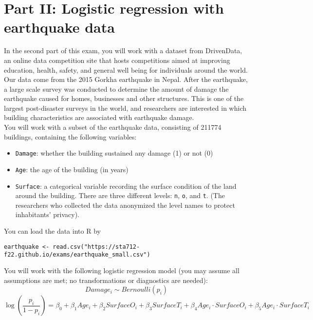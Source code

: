 \documentclass[11pt]{article}
\begin{document}
\newpage

\section*{Part II: Logistic regression with earthquake data}

In the second part of this exam, you will work with a dataset from DrivenData, an online data competition site that hosts competitions aimed at improving education, health, safety, and general well being for individuals around the world.\\

\noindent Our data come from the 2015 Gorkha earthquake in Nepal. After the earthquake, a large scale survey was conducted to determine the amount of damage the earthquake caused for homes, businesses and other structures. This is one of the largest post-disaster surveys in the world, and researchers are interested in which building characteristics are associated with earthquake damage.\\

\noindent You will work with a subset of the earthquake data, consisting of 211774 buildings, containing the following variables:
\begin{itemize}
\item \verb;Damage;: whether the building sustained any damage (1) or not (0)

\item \verb;Age;: the age of the building (in years)

\item \verb;Surface;: a categorical variable recording the surface condition of the land around the building. There are three different levels: \verb;n;, \verb;o;, and \verb;t;. (The researchers who collected the data anonymized the level names to protect inhabitants' privacy).
\end{itemize}

\noindent You can load the data into R by
\begin{verbatim}
earthquake <- read.csv("https://sta712-f22.github.io/exams/earthquake_small.csv")
\end{verbatim}

\noindent You will work with the following logistic regression model (you may assume all assumptions are met; no transformations or diagnostics are needed):
$$Damage_i \sim Bernoulli(p_i)$$
$$\log \left( \dfrac{p_i}{1 - p_i} \right) = \beta_0 + \beta_1 Age_i + \beta_2 SurfaceO_i + \beta_3 SurfaceT_i + \beta_4 Age_i \cdot SurfaceO_i + \beta_5 Age_i \cdot SurfaceT_i$$
\end{document}
